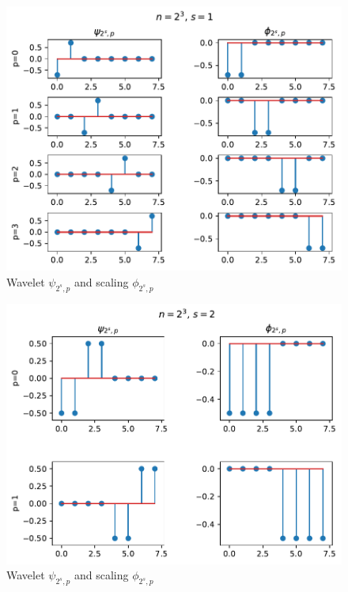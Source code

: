 \documentclass[12pt,twoside]{article}
\begin{document}
\begin{enumerate}
\begin{enumerate}
    
	\begin{figure}[H]
		\centering
		\captionsetup{justification=centering}
        		\includegraphics[width=400pt]{code/haar1d/psiphiplot_1_3.pdf}
		\caption{Wavelet $\psi_{2^s,p}$ and scaling $\phi_{2^s,p}$}
	\end{figure}
	\begin{figure}[H]
		\centering
		\captionsetup{justification=centering}
        		\includegraphics[width=400pt]{code/haar1d/psiphiplot_2_3.pdf}
		\caption{Wavelet $\psi_{2^s,p}$ and scaling $\phi_{2^s,p}$}
	\end{figure}
	\begin{figure}[H]

\end{figure}
\end{enumerate}
\end{enumerate}
\end{document}
